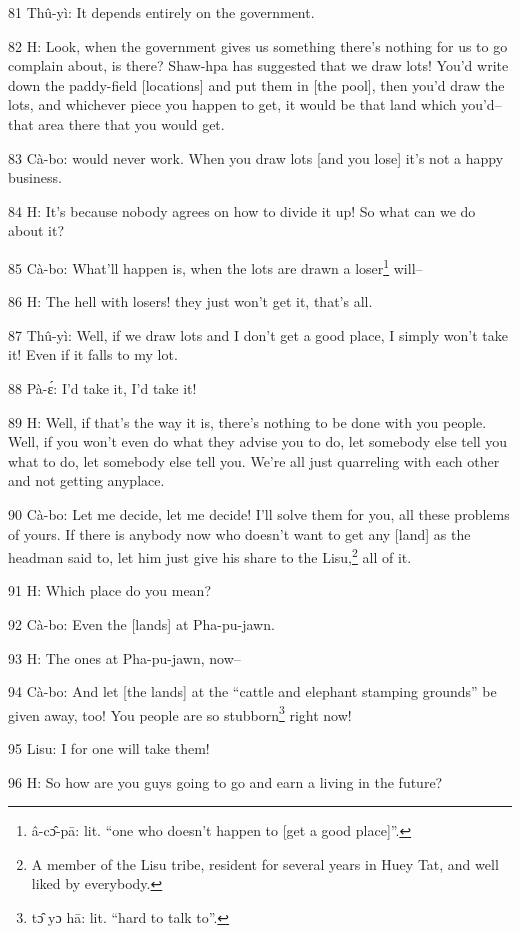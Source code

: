 81 Thû-yì: It depends entirely on the government.

82 H: Look, when the government gives us something there's nothing for us to go
complain about, is there? Shaw-hpa has suggested that we draw lots! You'd write
down the paddy-field [locations] and put them in [the pool], then you'd draw the
lots, and whichever piece you happen to get, it would be that land which you'd--that
area there that you would get.

83 Cà-bo: would never work. When you draw lots [and you lose] it's not a happy
business.

84 H: It's because nobody agrees on how to divide it up! So what can we do about
it?

85 Cà-bo: What'll happen is, when the lots are drawn a loser\footnote{â-cɔ̂-pā: lit. ``one who doesn't happen to [get a good place]''.} will--

86 H: The hell with losers! they just won't get it, that's all.

87 Thû-yì: Well, if we draw lots and I don't get a good place, I simply won't
take it! Even if it falls to my lot.

88 Pà-ɛ́: I'd take it, I'd take it!

89 H: Well, if that's the way it is, there's nothing to be done with you people.
Well, if you won't even do what they advise you to do, let somebody else tell you
what to do, let somebody else tell you. We're all just quarreling with each other
and not getting anyplace.

90 Cà-bo: Let me decide, let me decide! I'll solve them for you, all these problems
of yours. If there is anybody now who doesn't want to get any [land] as the headman
said to, let him just give his share to the Lisu,\footnote{A member of the Lisu tribe, resident for several years in Huey Tat, and well liked by everybody.} all of it.

91 H: Which place do you mean?

92 Cà-bo: Even the [lands] at Pha-pu-jawn.

93 H: The ones at Pha-pu-jawn, now--

94 Cà-bo: And let [the lands] at the ``cattle and elephant stamping grounds''
be given away, too! You people are so stubborn\footnote{tɔ̂ yɔ hā: lit. ``hard to talk to''.} right now!

95 Lisu: I for one will take them!

96 H: So how are you guys going to go and earn a living in the future?

